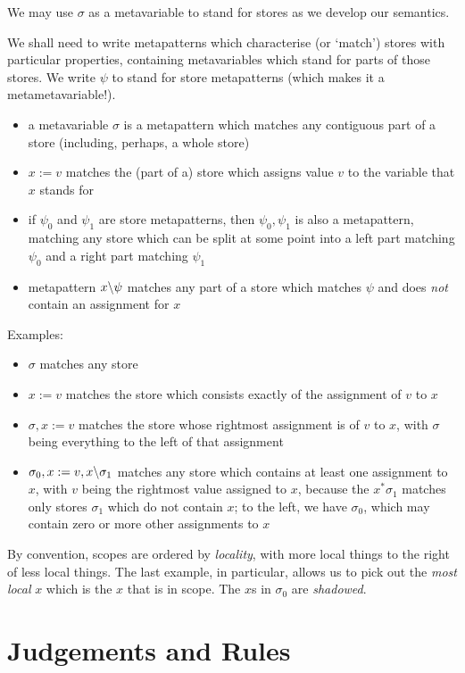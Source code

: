 \documentclass{article}
\begin{document}
We may use $\sigma$ as a metavariable to stand for stores as we develop our semantics.

We shall need to write metapatterns which characterise (or `match') stores with particular properties, containing metavariables which stand for parts of those stores. We write $\psi$ to stand for store metapatterns (which makes it a metametavariable!).
\begin{itemize}
\item a metavariable $\sigma$ is a metapattern which matches any contiguous part of a store (including, perhaps, a whole store)
\item $x := v$ matches the (part of a) store which assigns value $v$ to the variable that $x$ stands for
\item if $\psi_0$ and $\psi_1$ are store metapatterns, then $\psi_0,\psi_1$ is also a metapattern, matching any store which can be split at some point into a left part matching $\psi_0$ and a right part matching $\psi_1$
\item metapattern $x \backslash \psi$ matches any part of a store which matches $\psi$ and does \emph{not} contain an assignment for $x$
\end{itemize}

Examples:
\begin{itemize}
\item $\sigma$ matches any store
\item $x := v$ matches the store which consists exactly of the assignment of $v$ to $x$
\item $\sigma, x := v$ matches the store whose rightmost assignment is of $v$ to $x$, with $\sigma$ being everything to the left of that assignment
\item $\sigma_0, x := v, x \backslash \sigma_1$ matches any store which contains at least one assignment to $x$, with $v$ being the rightmost value assigned to $x$, because the $x^\ast\sigma_1$ matches only stores $\sigma_1$ which do not contain $x$; to the left, we have $\sigma_0$, which may contain zero or more other assignments to $x$
\end{itemize}
By convention, scopes are ordered by \emph{locality}, with more local things to the right of less local things.
The last example, in particular, allows us to pick out the \emph{most local} $x$ which is the $x$ that is in scope. The $x$s in $\sigma_0$ are \emph{shadowed}.

\section{Judgements and Rules}
\end{document}
